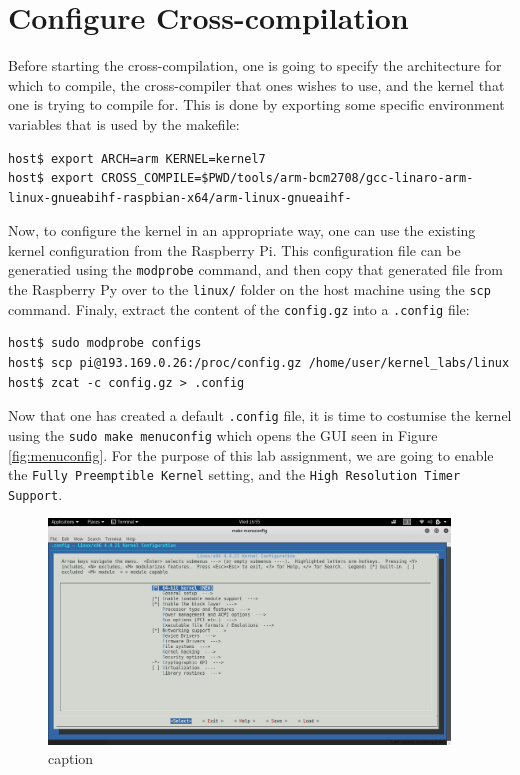 \documentclass[a4paper,oneside,onecolumn]{article}
\newcommand{\code}[1]{\colorbox{codegray}{\texttt{#1}}}
\begin{document}
\section{Configure Cross-compilation}

Before starting the cross-compilation, one is going to specify the architecture for which to compile, the cross-compiler that ones wishes to use, and the kernel that one is trying to compile for. This is done by exporting some specific environment variables that is used by the makefile:
\begin{lstlisting}
host$ export ARCH=arm KERNEL=kernel7
host$ export CROSS_COMPILE=$PWD/tools/arm-bcm2708/gcc-linaro-arm-linux-gnueabihf-raspbian-x64/arm-linux-gnueaihf-
\end{lstlisting}
Now, to configure the kernel in an appropriate way, one can use the existing kernel configuration from the Raspberry Pi. This configuration file can be generatied using the \code{modprobe} command, and then copy that generated file from the Raspberry Py over to the \texttt{linux/} folder on the host machine using the \code{scp} command. Finaly, extract the content of the \texttt{config.gz} into a \texttt{.config} file:
\begin{lstlisting}
host$ sudo modprobe configs
host$ scp pi@193.169.0.26:/proc/config.gz /home/user/kernel_labs/linux
host$ zcat -c config.gz > .config
\end{lstlisting}
Now that one has created a default \texttt{.config} file, it is time to costumise the kernel using the \code{sudo make menuconfig} which opens the GUI seen in Figure \ref{fig:menuconfig}. For the purpose of this lab assignment, we are going to enable the \texttt{Fully Preemptible Kernel} setting, and the \texttt{High Resolution Timer Support}.
\begin{figure}[htbp]
	\centering
	\includegraphics[width=0.95\textwidth]{resources/meunconfig.png}
	\caption{caption}
	\label{fig:label}
\end{figure}
\end{document}
